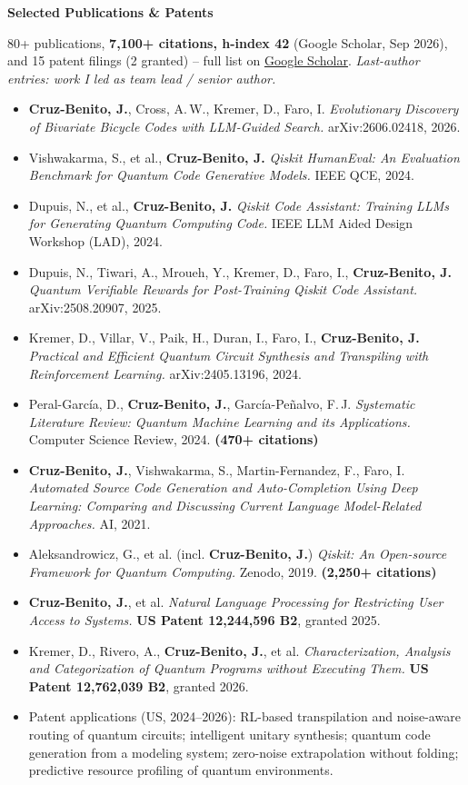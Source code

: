 \documentclass[a4paper,10pt]{article}
\newcommand{\cvsection}[1]{%
  \vspace{2.5mm}%
  \begin{tcolorbox}{\headfont\bfseries\large\color{accent} #1}\end{tcolorbox}%
  \vspace{-1.5mm}%
}
\newenvironment{bullets}
  {\begin{justify}\begin{itemize}[leftmargin=3ex, rightmargin=0.5ex, noitemsep, topsep=0.8mm, labelsep=1.2mm]\small}
  {\end{itemize}\end{justify}\vspace{1.2mm}}
\begin{document}
\newpage
\cvsection{Selected Publications \& Patents}
{\small 80+ publications, \textbf{7,100+ citations, h-index 42} (Google Scholar, Sep 2026), and 15 patent filings (2 granted) -- full list on \href{https://scholar.google.es/citations?user=_mLnQPgAAAAJ}{\underline{Google Scholar}}. \textit{Last-author entries: work I led as team lead / senior author.}}
\begin{bullets}
  \item \textbf{Cruz-Benito, J.}, Cross, A.\,W., Kremer, D., Faro, I. \textit{Evolutionary Discovery of Bivariate Bicycle Codes with LLM-Guided Search.} arXiv:2606.02418, 2026.
  \item Vishwakarma, S., et al., \textbf{Cruz-Benito, J.} \textit{Qiskit HumanEval: An Evaluation Benchmark for Quantum Code Generative Models.} IEEE QCE, 2024.
  \item Dupuis, N., et al., \textbf{Cruz-Benito, J.} \textit{Qiskit Code Assistant: Training LLMs for Generating Quantum Computing Code.} IEEE LLM Aided Design Workshop (LAD), 2024.
  \item Dupuis, N., Tiwari, A., Mroueh, Y., Kremer, D., Faro, I., \textbf{Cruz-Benito, J.} \textit{Quantum Verifiable Rewards for Post-Training Qiskit Code Assistant.} arXiv:2508.20907, 2025.
  \item Kremer, D., Villar, V., Paik, H., Duran, I., Faro, I., \textbf{Cruz-Benito, J.} \textit{Practical and Efficient Quantum Circuit Synthesis and Transpiling with Reinforcement Learning.} arXiv:2405.13196, 2024.
  \item Peral-Garc\'ia, D., \textbf{Cruz-Benito, J.}, Garc\'ia-Pe\~nalvo, F.\,J. \textit{Systematic Literature Review: Quantum Machine Learning and its Applications.} Computer Science Review, 2024. \textbf{(470+ citations)}
  \item \textbf{Cruz-Benito, J.}, Vishwakarma, S., Martin-Fernandez, F., Faro, I. \textit{Automated Source Code Generation and Auto-Completion Using Deep Learning: Comparing and Discussing Current Language Model-Related Approaches.} AI, 2021.
  \item Aleksandrowicz, G., et al. (incl. \textbf{Cruz-Benito, J.}) \textit{Qiskit: An Open-source Framework for Quantum Computing.} Zenodo, 2019. \textbf{(2,250+ citations)}
  \item \textbf{Cruz-Benito, J.}, et al. \textit{Natural Language Processing for Restricting User Access to Systems.} \textbf{US Patent 12,244,596 B2}, granted 2025.
  \item Kremer, D., Rivero, A., \textbf{Cruz-Benito, J.}, et al. \textit{Characterization, Analysis and Categorization of Quantum Programs without Executing Them.} \textbf{US Patent 12,762,039 B2}, granted 2026.
  \item Patent applications (US, 2024--2026): RL-based transpilation and noise-aware routing of quantum circuits; intelligent unitary synthesis; quantum code generation from a modeling system; zero-noise extrapolation without folding; predictive resource profiling of quantum environments.
\end{bullets}
\end{document}
